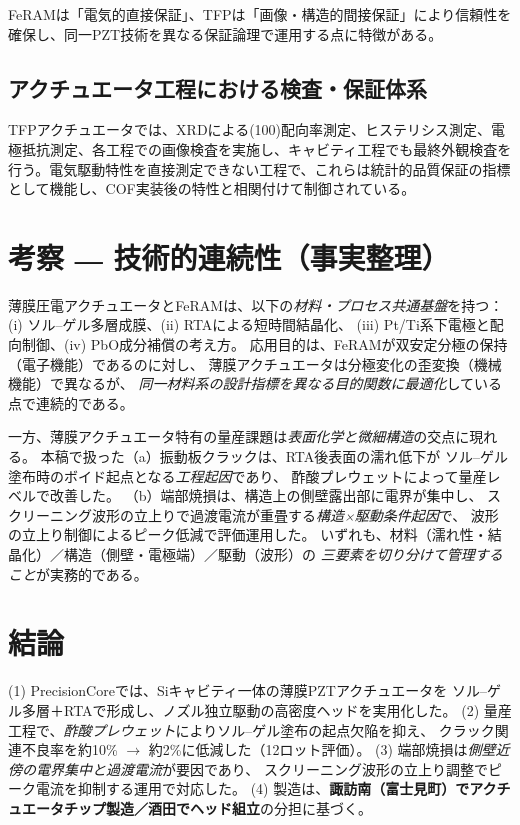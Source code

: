 \documentclass[conference]{IEEEtran}
\begin{document}
FeRAMは「電気的直接保証」、TFPは「画像・構造的間接保証」により信頼性を確保し、同一PZT技術を異なる保証論理で運用する点に特徴がある。

\subsection{アクチュエータ工程における検査・保証体系}
TFPアクチュエータでは、XRDによる(100)配向率測定、ヒステリシス測定、電極抵抗測定、各工程での画像検査を実施し、キャビティ工程でも最終外観検査を行う。電気駆動特性を直接測定できない工程で、これらは統計的品質保証の指標として機能し、COF実装後の特性と相関付けて制御されている。

\section{考察 ― 技術的連続性（事実整理）}
薄膜圧電アクチュエータとFeRAMは、以下の\emph{材料・プロセス共通基盤}を持つ：
(i) ソル–ゲル多層成膜、(ii) RTAによる短時間結晶化、
(iii) Pt/Ti系下電極と配向制御、(iv) PbO成分補償の考え方\cite{bottaro1993solgel,scott2000review,damjanovic2010ferro}。
応用目的は、FeRAMが双安定分極の保持（電子機能）であるのに対し、
薄膜アクチュエータは分極変化の歪変換（機械機能）で異なるが、
\emph{同一材料系の設計指標を異なる目的関数に最適化}している点で連続的である。

一方、薄膜アクチュエータ特有の量産課題は\emph{表面化学と微細構造}の交点に現れる。
本稿で扱った（a）振動板クラックは、RTA後表面の濡れ低下が
ソル–ゲル塗布時のボイド起点となる\emph{工程起因}であり、
酢酸プレウェットによって量産レベルで改善した。
（b）端部焼損は、構造上の側壁露出部に電界が集中し、
スクリーニング波形の立上りで過渡電流が重畳する\emph{構造×駆動条件起因}で、
波形の立上り制御によるピーク低減で評価運用した。
いずれも、材料（濡れ性・結晶化）／構造（側壁・電極端）／駆動（波形）の
\emph{三要素を切り分けて管理すること}が実務的である。

\section{結論}
(1) PrecisionCoreでは、Siキャビティ一体の薄膜PZTアクチュエータを
ソル–ゲル多層＋RTAで形成し、ノズル独立駆動の高密度ヘッドを実用化した\cite{uemura2014mems}。
(2) 量産工程で、\emph{酢酸プレウェット}によりソル–ゲル塗布の起点欠陥を抑え、
クラック関連不良率を約10\% $\rightarrow$ 約2\%に低減した（12ロット評価）。
(3) 端部焼損は\emph{側壁近傍の電界集中と過渡電流}が要因であり、
スクリーニング波形の立上り調整でピーク電流を抑制する運用で対応した。
(4) 製造は、\textbf{諏訪南（富士見町）でアクチュエータチップ製造／酒田でヘッド組立}の分担に基づく。
\end{document}
